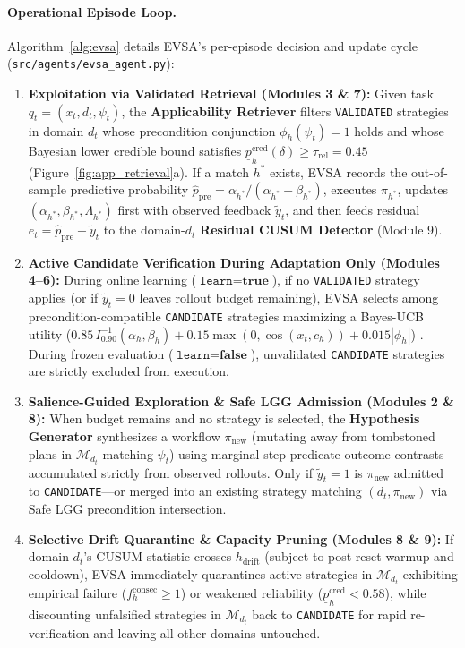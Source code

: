 \documentclass[10pt,letterpaper]{article}
\begin{document}
\paragraph{Operational Episode Loop.}
Algorithm~\ref{alg:evsa} details EVSA's per-episode decision and update cycle (\texttt{src/\allowbreak agents/\allowbreak evsa\_agent.py}):
\begin{enumerate}
  \item \textbf{Exploitation via Validated Retrieval (Modules 3 \& 7):} Given task $q_t = (x_t, d_t, \psi_t)$, the \textbf{Applicability Retriever} filters \texttt{VALIDATED} strategies in domain $d_t$ whose precondition conjunction $\phi_h(\psi_t) = 1$ holds and whose Bayesian lower credible bound satisfies $\underline{p}_h^{\mathrm{cred}}(\delta) \ge \tau_{\mathrm{rel}} = 0.45$ (Figure~\ref{fig:app_retrieval}a). If a match $h^*$ exists, EVSA records the out-of-sample predictive probability $\hat{p}_{\mathrm{pre}} = \alpha_{h^*}/(\alpha_{h^*} + \beta_{h^*})$, executes $\pi_{h^*}$, updates $(\alpha_{h^*}, \beta_{h^*}, \Lambda_{h^*})$ first with observed feedback $\tilde{y}_t$, and then feeds residual $e_t = \hat{p}_{\mathrm{pre}} - \tilde{y}_t$ to the domain-$d_t$ \textbf{Residual CUSUM Detector} (Module 9).
  \item \textbf{Active Candidate Verification During Adaptation Only (Modules 4--6):} During online learning ($\texttt{learn}=\textbf{true}$), if no \texttt{VALIDATED} strategy applies (or if $\tilde{y}_t = 0$ leaves rollout budget remaining), EVSA selects among precondition-compatible \texttt{CANDIDATE} strategies maximizing a Bayes-UCB utility ($0.85\,I_{0.90}^{-1}(\alpha_h, \beta_h) + \allowbreak 0.15\max(0,\cos(x_t, c_h)) + \allowbreak 0.015|\phi_h|$) \cite{kaufmann2012bayesian}. During frozen evaluation ($\texttt{learn}=\textbf{false}$), unvalidated \texttt{CANDIDATE} strategies are strictly excluded from execution.
  \item \textbf{Salience-Guided Exploration \& Safe LGG Admission (Modules 2 \& 8):} When budget remains and no strategy is selected, the \textbf{Hypothesis Generator} synthesizes a workflow $\pi_{\mathrm{new}}$ (mutating away from tombstoned plans in $\mathcal{M}_{d_t}$ matching $\psi_t$) using marginal step-predicate outcome contrasts accumulated strictly from observed rollouts. Only if $\tilde{y}_t = 1$ is $\pi_{\mathrm{new}}$ admitted to \texttt{CANDIDATE}—or merged into an existing strategy matching $(d_t, \pi_{\mathrm{new}})$ via Safe LGG precondition intersection.
  \item \textbf{Selective Drift Quarantine \& Capacity Pruning (Modules 8 \& 9):} If domain-$d_t$'s CUSUM statistic crosses $h_{\mathrm{drift}}$ (subject to post-reset warmup and cooldown), EVSA immediately quarantines active strategies in $\mathcal{M}_{d_t}$ exhibiting empirical failure ($f_h^{\mathrm{consec}} \ge 1$) or weakened reliability ($\underline{p}_h^{\mathrm{cred}} < 0.58$), while discounting unfalsified strategies in $\mathcal{M}_{d_t}$ back to \texttt{CANDIDATE} for rapid re-verification and leaving all other domains untouched.
\end{enumerate}
\end{document}
